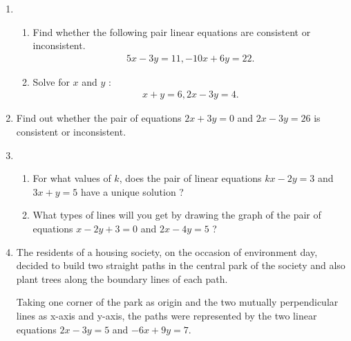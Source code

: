 %
\begin{enumerate}
\item 
\begin{enumerate}
    \item Find whether the following pair linear equations are consistent or 
inconsistent.
\begin{align}
        5x-3y=11, -10x+6y=22.
\end{align}
    \item Solve for $x$ and $y$ :
\begin{align}
     x+y=6, 2x-3y=4.
\end{align}   
 \end{enumerate}
 \item Find out whether the pair of equations $2x+3y=0$ and $2x-3y=26$ is consistent or inconsistent.
\item 
\begin{enumerate}
    \item For what values of $k$, does the pair of linear equations $kx-2y=3$ and $3x+y=5$ have a unique solution ?
    \item What types of lines will you get by drawing the graph of the pair of equations $x-2y+3=0$ and $2x-4y=5$ ?
\end{enumerate}
\item The residents of a housing society, on the occasion of environment day, decided to build two straight paths in the central park of the society and also plant trees along the boundary lines of each path.

Taking one corner of the park as origin and the two mutually perpendicular lines as x-axis and y-axis, the paths were represented by the two linear equations $2x-3y=5$ and $-6x+9y=7$.


\end{enumerate}

